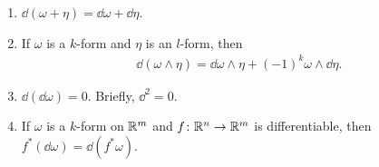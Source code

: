 \begin{theorem}
  \begin{enumerate}[label=\upshape{(\arabic*)}]
    \item $\dd (\omega+\eta) = \dd\omega + \dd\eta$.
    \item If $\omega$ is a $k$-form and $\eta$ is an $l$-form, then
      \begin{align*}
          \dd(\omega\wedge\eta) = \dd\omega\wedge\eta + (-1)^k\omega\wedge\dd\eta.
      \end{align*}
    \item $\dd(\dd \omega) = 0$. Briefly, $\dd^2 = 0$.%
    \item If $\omega$ is a $k$-form on $\mathbb{R}^m$ and $f\colon{}\mathbb{R}^n\to \mathbb{R}^m$ is 
        differentiable, then $f^*(\dd\omega) = \dd(f^*\omega)$.
  \end{enumerate}
\end{theorem}


